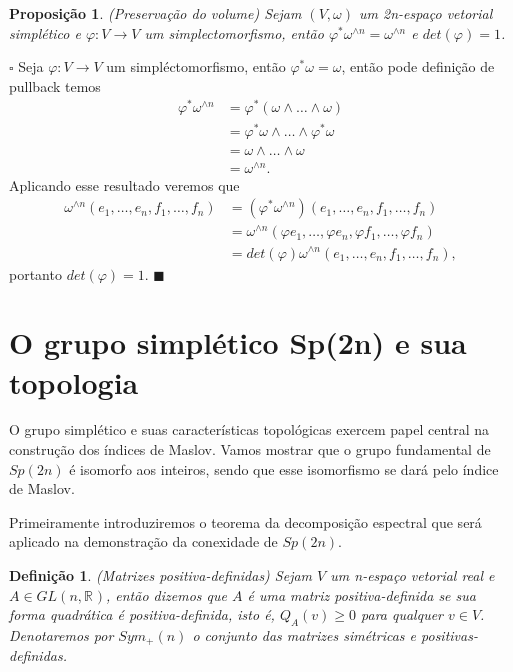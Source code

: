 \documentclass[12pt]{book}
\newtheorem{definicao}[teorema]{Definição}
\newtheorem{proposicao}[teorema]{Proposição}
\newenvironment{prova}[1]{$\square$ #1}{\hfill$\blacksquare$}
\newcommand{\generalgroup}[2]{GL(#1, #2)}
\newcommand{\generalgroupreal}[1]{\generalgroup{#1}{\real{}}}
\newcommand{\gruposimpletico}[1]{Sp(#1)}
\newcommand{\matrizsimetricapositiva}[1]{Sym_{+}(#1)}
\newcommand{\real}[1]{\mathbb{R}^{#1}}
\begin{document}
	\begin{proposicao}\label{proposicao_preservacao_volume}
		(Preservação do volume) Sejam $(V,\omega)$ um 2n-espaço vetorial simplético e $\varphi:V\to V$ um simplectomorfismo, então $\varphi^{*}\omega^{\wedge n}=\omega^{\wedge n}$ e $det(\varphi)=1$.
	\end{proposicao}
	\begin{prova}
		Seja $\varphi:V \to V$ um simpléctomorfismo, então $\varphi^{*}\omega = \omega$, então pode definição de pullback temos
		$$
		\begin{aligned}
			\varphi^{*}\omega^{\wedge n} 
			&= 
			\varphi^{*}(\omega\wedge \dots \wedge\omega) 
			\\
			&= \varphi^{*}\omega\wedge \dots \wedge\varphi^{*}\omega
			\\
			&=\omega\wedge \dots \wedge \omega 
			\\
			&= \omega^{\wedge n}.
		\end{aligned} 
		$$
		Aplicando esse resultado veremos que
		$$
		\begin{aligned}
		\omega^{\wedge n}(e_{1}, \dots,e_{n}, f_{1},\dots, f_{n})
		&=(\varphi^{*}\omega^{\wedge n})(e_{1}, \dots, e_{n}, f_{1},\dots, f_{n})
		\\
		&=
		\omega^{\wedge n}(\varphi e_{1}, \dots,\varphi  e_{n}, \varphi f_{1},\dots, \varphi f_{n})
		\\
		&=det(\varphi)\omega^{\wedge n}(e_{1}, \dots, e_{n}, f_{1},\dots, f_{n}),
		\end{aligned}
		$$
		portanto $det(\varphi) = 1$.
	\end{prova}
	
	\section{O grupo simplético 
		\gruposimpletico{2n} e sua topologia}
	O grupo simplético e suas características topológicas exercem papel central na construção dos índices de Maslov. Vamos mostrar que o grupo fundamental de $Sp(2n)$ é isomorfo aos inteiros, sendo que esse isomorfismo se dará pelo índice de Maslov.

	Primeiramente introduziremos o teorema da decomposição espectral que será aplicado na demonstração da conexidade de $\gruposimpletico{2n}$.
	
	\begin{definicao}\label{definicao_matriz_positiva_definida}
		(Matrizes positiva-definidas) Sejam $V$ um n-espaço vetorial real  e $A \in \generalgroupreal{n}$, então dizemos que $A$ é uma matriz positiva-definida se sua forma quadrática é positiva-definida, isto é, $Q_{A}(v)\ge 0$ para qualquer $v\in V$. Denotaremos por $\matrizsimetricapositiva{n}$ o conjunto das matrizes simétricas e positivas-definidas.
	\end{definicao}
	
\end{document}

